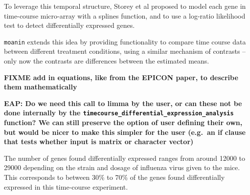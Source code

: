 \documentclass[9pt,a4paper,]{extarticle}
\newenvironment{Shaded}{\begin{snugshade}}{\end{snugshade}}
\newcommand{\CommentTok}[1]{\textcolor[rgb]{0.56,0.35,0.01}{\textit{#1}}}
\newcommand{\DataTypeTok}[1]{\textcolor[rgb]{0.13,0.29,0.53}{#1}}
\newcommand{\DecValTok}[1]{\textcolor[rgb]{0.00,0.00,0.81}{#1}}
\newcommand{\KeywordTok}[1]{\textcolor[rgb]{0.13,0.29,0.53}{\textbf{#1}}}
\newcommand{\NormalTok}[1]{#1}
\newcommand{\OperatorTok}[1]{\textcolor[rgb]{0.81,0.36,0.00}{\textbf{#1}}}
\newcommand{\OtherTok}[1]{\textcolor[rgb]{0.56,0.35,0.01}{#1}}
\newcommand{\StringTok}[1]{\textcolor[rgb]{0.31,0.60,0.02}{#1}}
\begin{document}
To leverage this temporal structure, Storey et al \citep{storey:significance}
proposed to model each gene in time-course micro-array with a splines
function, and to use a log-ratio likelihood test to detect differentially
expressed genes.

\texttt{moanin} extends this idea by providing functionality to compare time course
data between different treatment conditions, using a similar mechanism of
contrasts -- only now the contrasts are differences between the estimated
means.

\textbf{FIXME add in equations, like from the EPICON paper, to describe them mathematically}

\textbf{EAP: Do we need this call to limma by the user, or can these not be done
internally by the \texttt{timecourse\_differential\_expression\_analysis} function? We
can still preserve the option of user defining their own, but would be nicer
to make this simpler for the user (e.g.~an if clause that tests whether input
is matrix or character vector)}

\begin{Shaded}
\end{Shaded}

The number of genes found differentially expressed ranges from around 12000 to
29000 depending on the strain and dosage of influenza virus given to the mice.
This corresponds to between 30\% to 70\% of the genes found differentially
expressed in this time-course experiment.
\end{document}
